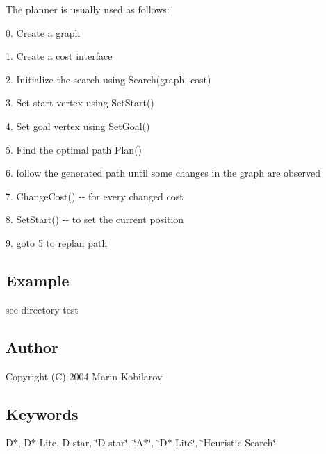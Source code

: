 \-The planner is usually used as follows\-:
\begin{DoxyItemize}
\item 0. \-Create a graph
\item 1. \-Create a cost interface
\item 2. \-Initialize the search using \-Search(graph, cost)
\item 3. \-Set start vertex using \-Set\-Start()
\item 4. \-Set goal vertex using \-Set\-Goal()
\item 5. \-Find the optimal path \-Plan()
\item 6. follow the generated path until some changes in the graph are observed
\item 7. \-Change\-Cost() -\/-\/ for every changed cost
\item 8. \-Set\-Start() -\/-\/ to set the current position
\item 9. goto 5 to replan path
\end{DoxyItemize}\subsection{\-Example}\label{index_Example}
see directory test \subsection{\-Author}\label{index_Author}
\-Copyright (\-C) 2004 \-Marin \-Kobilarov \subsection{\-Keywords}\label{index_Keywords}
\-D$\ast$, \-D$\ast$-\/\-Lite, \-D-\/star, \char`\"{}\-D star\char`\"{}, \char`\"{}\-A$\ast$\char`\"{}, \char`\"{}\-D$\ast$ Lite\char`\"{}, \char`\"{}\-Heuristic Search\char`\"{} 